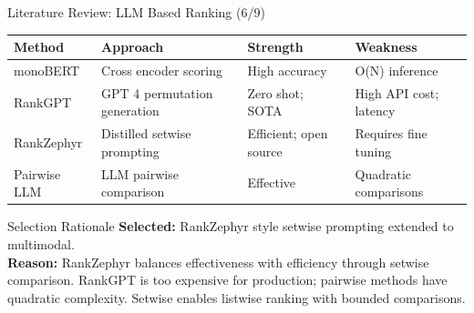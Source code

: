 \documentclass[aspectratio=169,xcolor=dvipsnames]{beamer}
\begin{document}
\begin{frame}{Literature Review: LLM Based Ranking (6/9)}
    \scriptsize
    \begin{table}
        \centering
        \renewcommand{\arraystretch}{1.1}
        \begin{tabular}{p{}|p{}|p{}|p{}}
        \toprule
        \textbf{Method} & \textbf{Approach} & \textbf{Strength} & \textbf{Weakness} \\
        \midrule
        monoBERT \cite{nogueira2019passage} & Cross encoder scoring & High accuracy & O(N) inference \\
        \midrule
        RankGPT \cite{sun2023chatgpt} & GPT 4 permutation generation & Zero shot; SOTA & High API cost; latency \\
        \midrule
        RankZephyr \cite{pradeep2023rankzephyr} & Distilled setwise prompting & Efficient; open source & Requires fine tuning \\
        \midrule
        Pairwise LLM \cite{qin2023pairwise} & LLM pairwise comparison & Effective & Quadratic comparisons \\
        \bottomrule
        \end{tabular}
    \end{table}
    
    \vspace{0.3em}
    \begin{block}{Selection Rationale}
        \textbf{Selected:} RankZephyr style setwise prompting extended to multimodal. \\
        \textbf{Reason:} RankZephyr balances effectiveness with efficiency through setwise comparison. RankGPT is too expensive for production; pairwise methods have quadratic complexity. Setwise enables listwise ranking with bounded comparisons.
    \end{block}
\end{frame}
\end{document}
